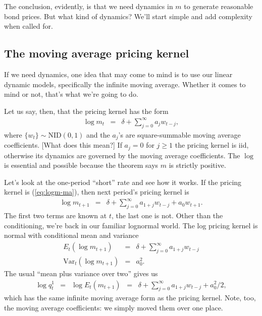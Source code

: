\documentclass[11pt]{article}
\begin{document}
The conclusion, evidently, is that we need dynamics in $m$
to generate reasonable bond prices.
But what kind of dynamics?
We'll start simple and add complexity when called for.


\subsection*{The moving average pricing kernel}

If we need dynamics, one idea that may come to mind is to use
our linear dynamic models, specifically the infinite moving average.
Whether it comes to mind or not, that's what we're going to do.

Let us say, then, that the pricing kernel has the form
\begin{eqnarray}
    \log m_t &=& \delta + \sum_{j=0}^\infty a_j w_{t-j} ,
    \label{eq:logm-ma}
\end{eqnarray}
where $\{ w_t \} \sim \mbox{NID}(0,1)$ and
the $a_j$'s are square-summable moving average coefficients.
[What does this mean?]
If $a_j = 0$ for $j \geq 1$ the pricing kernel is iid,
otherwise its dynamics
are governed by the moving average coefficients.
The $\log$ is essential and possible because the theorem
says $m$ is strictly positive.

Let's look at the one-period ``short'' rate and see how it works.
If the pricing kernel is (\ref{eq:logm-ma}),
then next period's pricing kernel is
\begin{eqnarray*}
    \log m_{t+1} &=& \delta + \sum_{j=0}^\infty a_{1+j} w_{t-j} + a_0 w_{t+1} .
\end{eqnarray*}
The first two terms are known at $t$, the last one is not.
Other than the conditioning, we're back in our familiar lognormal world.
The log pricing kernel is normal with conditional mean and variance
\begin{eqnarray*}
    E_t ( \log m_{t+1}) &=& \delta + \sum_{j=0}^\infty a_{1+j} w_{t-j} \\
    \mbox{Var}_t ( \log m_{t+1}) &=& a_0^2 .
\end{eqnarray*}
The usual ``mean plus variance over two'' gives us
\begin{eqnarray*}
    \log q^1_t &=& \log E_t \left(m_{t+1}\right)
            \;\;=\;\; \delta + \sum_{j=0}^\infty a_{1+j} w_{t-j} + a_0^2/2 ,
\end{eqnarray*}
which has the same infinite moving average form as the pricing kernel.
Note, too, the moving average coefficients:
we simply moved them over one place.
\end{document}
